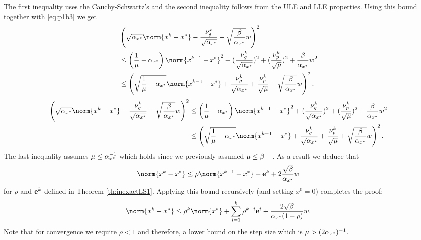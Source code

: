 \fi
The first inequality uses the Cauchy-Schwartz's and the second inequality follows from the ULE and LLE properties. Using this bound together with \eqref{eq:p1b3} we get
\ifCLASSOPTIONtwocolumn
\begin{align*}
&\left(\sqrt{\mmx}\norm{x^k-x^\gt}-\frac{\nug^k}{\sqrt{\mmx}}- \sqrt{\frac{\MM}{\mmx}}w\right)^2\\
&\leq \left(\frac{1}{\mu}-\mmx \right)\norm{x^{k-1}-x^\gt}^2 + (\frac{\nug^k}{\sqrt{\mmx}})^2+ (\frac{\nup^k}{\sqrt\mu})^2+\frac{\MM}{\mmx}w^2 \\
&\leq \left(\sqrt{\frac{1}{\mu}-\mmx} \norm{x^{k-1}-x^\gt} + \frac{\nug^k}{\sqrt{\mmx}}+ \frac{\nup^k}{\sqrt\mu}+\sqrt{\frac{\MM}{\mmx}}w \right)^2.
\end{align*}
\else
\begin{align*}
\left(\sqrt{\mmx}\norm{x^k-x^\gt}-\frac{\nug^k}{\sqrt{\mmx}}- \sqrt{\frac{\MM}{\mmx}}w\right)^2
&\leq \left(\frac{1}{\mu}-\mmx \right)\norm{x^{k-1}-x^\gt}^2 + (\frac{\nug^k}{\sqrt{\mmx}})^2+ (\frac{\nup^k}{\sqrt\mu})^2+\frac{\MM}{\mmx}w^2 \\
&\leq \left(\sqrt{\frac{1}{\mu}-\mmx} \norm{x^{k-1}-x^\gt} + \frac{\nug^k}{\sqrt{\mmx}}+ \frac{\nup^k}{\sqrt\mu}+\sqrt{\frac{\MM}{\mmx}}w \right)^2.
\end{align*}
\fi
The last inequality assumes $\mu\leq \alpha_{x^*}^{-1}$ which holds since we previously assumed $\mu\leq \beta^{-1}$. As a result we deduce that
\begin{align}
\norm{x^k-x^\gt}\leq \rho \norm{x^{k-1}-x^\gt} + \nut^k + 2\frac{\sqrt{\MM}}{\mmx}w \label{eq:p1b4}
\end{align}
for $\rho$ and $\mathbf{e}^k$ defined in Theorem \ref{th:inexactLS1}. Applying this bound recursively (and setting $x^0=0$) completes the proof:
\begin{align*}
\norm{x^k-x^\gt}\leq \rho^k \norm{x^\gt} + \sum_{i=1}^k \rho^{k-i} \nut^i + \frac{2\sqrt{\MM}}{\mmx(1-\rho)}w.
\end{align*} 
Note that for convergence we require $\rho<1$ and therefore, a lower bound on the step size which is $\mu> (2\alpha_{x^*})^{-1}$. 

